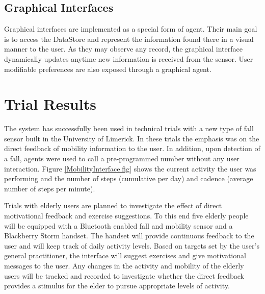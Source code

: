 \documentclass[conference,a4paper]{IEEEtran}
\begin{document}
\subsection{Graphical Interfaces}
Graphical interfaces are implemented as a special form of agent. Their main goal is to access the DataStore and represent the information found there in a visual manner to the user. As they may observe any record, the graphical interface dynamically updates anytime new information is received from the sensor. User modifiable preferences are also exposed through a graphical agent.

\section{Trial Results}
The system has successfully been used in technical trials with a new type of fall sensor built in the University of Limerick. In these trials the emphasis was on the direct feedback of mobility information to the user. In addition, upon detection of a fall, agents were used to call a pre-programmed number without any user interaction. Figure \ref{MobilityInterface.fig} shows the current activity the user was performing and the number of steps (cumulative per day) and cadence (average number of steps per minute).

Trials with elderly users are planned to investigate the effect of direct motivational feedback and exercise suggestions. To this end five elderly people will be equipped with a Bluetooth enabled fall and mobility sensor and a Blackberry Storm handset. The handset will provide continuous feedback to the user and will keep track of daily activity levels. Based on targets set by the user's general practitioner, the interface will suggest exercises and give motivational messages to the user. Any changes in the activity and mobility of the elderly users will be tracked and recorded to investigate whether the direct feedback provides a stimulus for the elder to pursue appropriate levels of activity.
\end{document}
